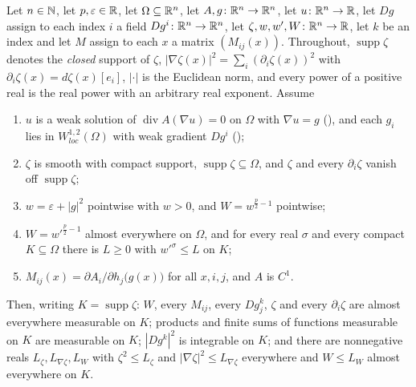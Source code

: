 \begin{helper}
Let $n\in\mathbb{N}$, let $p,\varepsilon\in\mathbb{R}$, let $\Omega\subseteq\mathbb{R}^n$, let
$A,g\colon\mathbb{R}^n\to\mathbb{R}^n$, let $u\colon\mathbb{R}^n\to\mathbb{R}$, let $Dg$ assign to each index
$i$ a field $Dg^i\colon\mathbb{R}^n\to\mathbb{R}^n$, let $\zeta,w,w',W\colon\mathbb{R}^n\to\mathbb{R}$, let $k$
be an index and let $M$ assign to each $x$ a matrix $(M_{ij}(x))$.  Throughout,
$\operatorname{supp}\zeta$ denotes the \emph{closed} support of $\zeta$,
$|\nabla\zeta(x)|^2=\sum_i(\partial_i\zeta(x))^2$ with
$\partial_i\zeta(x)=d\zeta(x)[e_i]$, $|\cdot|$ is the Euclidean norm, and every
power of a positive real is the real power with an arbitrary real exponent.
Assume
\begin{enumerate}
\item[(H1)] $u$ is a weak solution of $\operatorname{div}A(\nabla u)=0$ on
  $\Omega$ with $\nabla u=g$ (), and each $g_i$ lies
  in $W^{1,2}_{loc}(\Omega)$ with weak gradient $Dg^i$
  ();
\item[(H2)] $\zeta$ is smooth with compact support,
  $\operatorname{supp}\zeta\subseteq\Omega$, and $\zeta$ and every
  $\partial_i\zeta$ vanish off $\operatorname{supp}\zeta$;
\item[(H3)] $w=\varepsilon+|g|^2$ pointwise with $w>0$, and
  $W=w^{\frac p2-1}$ pointwise;
\item[(H4)] $W=w'^{\frac p2-1}$ almost everywhere on $\Omega$, and for every
  real $\sigma$ and every compact $K\subseteq\Omega$ there is $L\ge0$ with
  $w'^{\sigma}\le L$ on $K$;
\item[(H5)] $M_{ij}(x)=\partial A_i/\partial h_j\bigl(g(x)\bigr)$ for all
  $x,i,j$, and $A$ is $C^1$.
\end{enumerate}
Then, writing $K=\operatorname{supp}\zeta$: $W$, every $M_{ij}$, every $Dg^k_j$,
$\zeta$ and every $\partial_i\zeta$ are almost everywhere measurable on $K$;
products and finite sums of functions measurable on $K$ are measurable on $K$;
$|Dg^k|^2$ is integrable on $K$; and there are nonnegative reals
$L_\zeta,L_{\nabla\zeta},L_W$ with $\zeta^2\le L_\zeta$ and
$|\nabla\zeta|^2\le L_{\nabla\zeta}$ everywhere and $W\le L_W$ almost
everywhere on $K$.
\end{helper}
